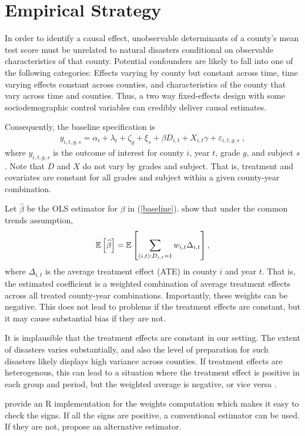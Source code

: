 
\section{Empirical Strategy}



In order to identify a causal effect, unobservable determinants of a county's mean test score must be unrelated to natural disasters conditional on observable characteristics of that county. Potential confounders are likely to fall into one of the following categories: Effects varying by county but constant across time, time varying effects constant across counties, and characteristics of the county that vary across time and counties. Thus, a two way fixed-effects design with some sociodemographic control variables can credibly deliver causal estimates.

Consequently, the baseline specification is
\begin{align} \label{baseline}
	y_{i, t, g, s} = \alpha_i + \lambda_t + \zeta_g + \xi_s + \beta D_{i, t} + X_{i, t} \gamma + \varepsilon_{i, t, g, s} \;,
\end{align}
where $y_{i, t, g, s}$ is the outcome of interest for county $i$, year $t$, grade $g$, and subject $s$. Note that $D$ and $X$ do not vary by grades and subject. That is, treatment and covariates are constant for all grades and subject within a given county-year combination.

Let $\widehat{\beta}$ be the OLS estimator for $\beta$ in (\ref{baseline}). \cite{deChaisemartin_2020} show that under the common trends assumption,
\begin{align*}
	\mathbb{E}\left[ \widehat{\beta} \right] = \mathbb{E}\left[  \sum_{(i, t): D_{i, t} = 1} w_{i, t} \Delta_{i, t} \right],
\end{align*}
where $\Delta_{i, t}$ is the average treatment effect (ATE) in county $i$ and year $t$. That is, the estimated coefficient is a weighted combination of average treatment effects across all treated county-year combinations. Importantly, these weights can be negative. This does not lead to problems if the treatment effects are constant, but it may cause substantial bias if they are not.

It is implausible that the treatment effects are constant in our setting. The extent of disasters varies substantially, and also the level of preparation for such disasters likely displays high variance across counties. If treatment effects are heterogenous, this can lead to a situation where the treatment effect is positive in each group and period, but the weighted average is negative, or vice versa \citep{deChaisemartin_2022}.

\cite{TwoWayFEWeights} provide an R implementation for the weights computation which makes it easy to check the signs. If all the signs are positive, a conventional estimator can be used. If they are not, \cite{deChaisemartin_2020} propose an alternative estimator.


